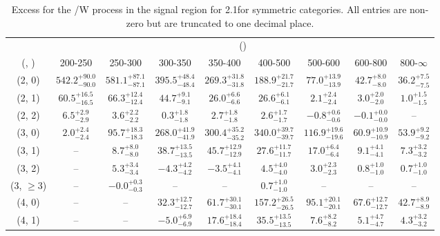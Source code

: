\begin{table}[h!]
\tiny
\centering
\caption{Excess for the \ttbar/W process in the signal region for 2.1\ifb for symmetric categories. All entries are non-zero but are truncated to one decimal place.\label{tab:excesssep_sig_ttw_sym}}
\begin{tabular}
{ccccccccc}
	\hline\hline
	& \multicolumn{8}{c}{\scalht (\gev)} \\ 
	 (\njet,  \nb) & 200-250 & 250-300 & 300-350 & 350-400 & 400-500 & 500-600 & 600-800 & 800-$\infty$ \\ [0.8ex] 
\hline
	(2, 0) & $542.2^{+ 90.0 }_{- 90.0 }$ & $581.1^{+ 87.1 }_{- 87.1 }$ & $395.5^{+ 48.4 }_{- 48.4 }$ & $269.3^{+ 31.8 }_{- 31.8 }$ & $188.9^{+ 21.7 }_{- 21.7 }$ & $77.0^{+ 13.9 }_{- 13.9 }$ & $42.7^{+ 8.0 }_{- 8.0 }$ & $36.2^{+ 7.5 }_{- 7.5 }$ \\[0.5ex] 
	(2, 1) & $60.5^{+ 16.5 }_{- 16.5 }$ & $66.3^{+ 12.4 }_{- 12.4 }$ & $44.7^{+ 9.1 }_{- 9.1 }$ & $26.0^{+ 6.6 }_{- 6.6 }$ & $26.6^{+ 6.1 }_{- 6.1 }$ & $2.1^{+ 2.4 }_{- 2.4 }$ & $3.0^{+ 2.0 }_{- 2.0 }$ & $1.0^{+ 1.5 }_{- 1.5 }$ \\[0.5ex] 
	(2, 2) & $6.5^{+ 2.9 }_{- 2.9 }$ & $3.6^{+ 2.2 }_{- 2.2 }$ & $0.3^{+ 1.8 }_{- 1.8 }$ & $2.7^{+ 1.8 }_{- 1.8 }$ & $2.6^{+ 1.7 }_{- 1.7 }$ & $-0.8^{+ 0.6 }_{- 0.6 }$ & $-0.1^{+ 0.0 }_{- 0.0 }$ & -- \\[0.5ex] 
	(3, 0) & $2.0^{+ 2.4 }_{- 2.4 }$ & $95.7^{+ 18.3 }_{- 18.3 }$ & $268.0^{+ 41.9 }_{- 41.9 }$ & $300.4^{+ 35.2 }_{- 35.2 }$ & $340.0^{+ 39.7 }_{- 39.7 }$ & $116.9^{+ 19.6 }_{- 19.6 }$ & $60.9^{+ 10.9 }_{- 10.9 }$ & $53.9^{+ 9.2 }_{- 9.2 }$ \\[0.5ex] 
	(3, 1) & -- & $8.7^{+ 8.0 }_{- 8.0 }$ & $38.7^{+ 13.5 }_{- 13.5 }$ & $45.7^{+ 12.9 }_{- 12.9 }$ & $27.6^{+ 11.7 }_{- 11.7 }$ & $17.0^{+ 6.4 }_{- 6.4 }$ & $9.1^{+ 4.1 }_{- 4.1 }$ & $7.3^{+ 3.2 }_{- 3.2 }$ \\[0.5ex] 
	(3, 2) & -- & $5.3^{+ 3.4 }_{- 3.4 }$ & $-4.3^{+ 4.2 }_{- 4.2 }$ & $-3.5^{+ 4.1 }_{- 4.1 }$ & $4.5^{+ 4.0 }_{- 4.0 }$ & $3.0^{+ 2.3 }_{- 2.3 }$ & $0.8^{+ 1.0 }_{- 1.0 }$ & $0.7^{+ 1.0 }_{- 1.0 }$ \\[0.5ex] 
	(3, $\ge3$) & -- & $-0.0^{+ 0.3 }_{- 0.3 }$ & -- & -- & $0.7^{+ 1.0 }_{- 1.0 }$ & -- & -- & -- \\[0.5ex] 
	(4, 0) & -- & -- & $32.3^{+ 12.7 }_{- 12.7 }$ & $61.7^{+ 30.1 }_{- 30.1 }$ & $157.2^{+ 26.5 }_{- 26.5 }$ & $95.1^{+ 20.1 }_{- 20.1 }$ & $67.6^{+ 12.7 }_{- 12.7 }$ & $42.7^{+ 8.9 }_{- 8.9 }$ \\[0.5ex] 
	(4, 1) & -- & -- & $-5.0^{+ 6.9 }_{- 6.9 }$ & $17.6^{+ 18.4 }_{- 18.4 }$ & $35.5^{+ 13.5 }_{- 13.5 }$ & $7.6^{+ 8.2 }_{- 8.2 }$ & $5.1^{+ 4.7 }_{- 4.7 }$ & $4.3^{+ 3.2 }_{- 3.2 }$ \\[0.5ex] 

\end{tabular}
\end{table}
